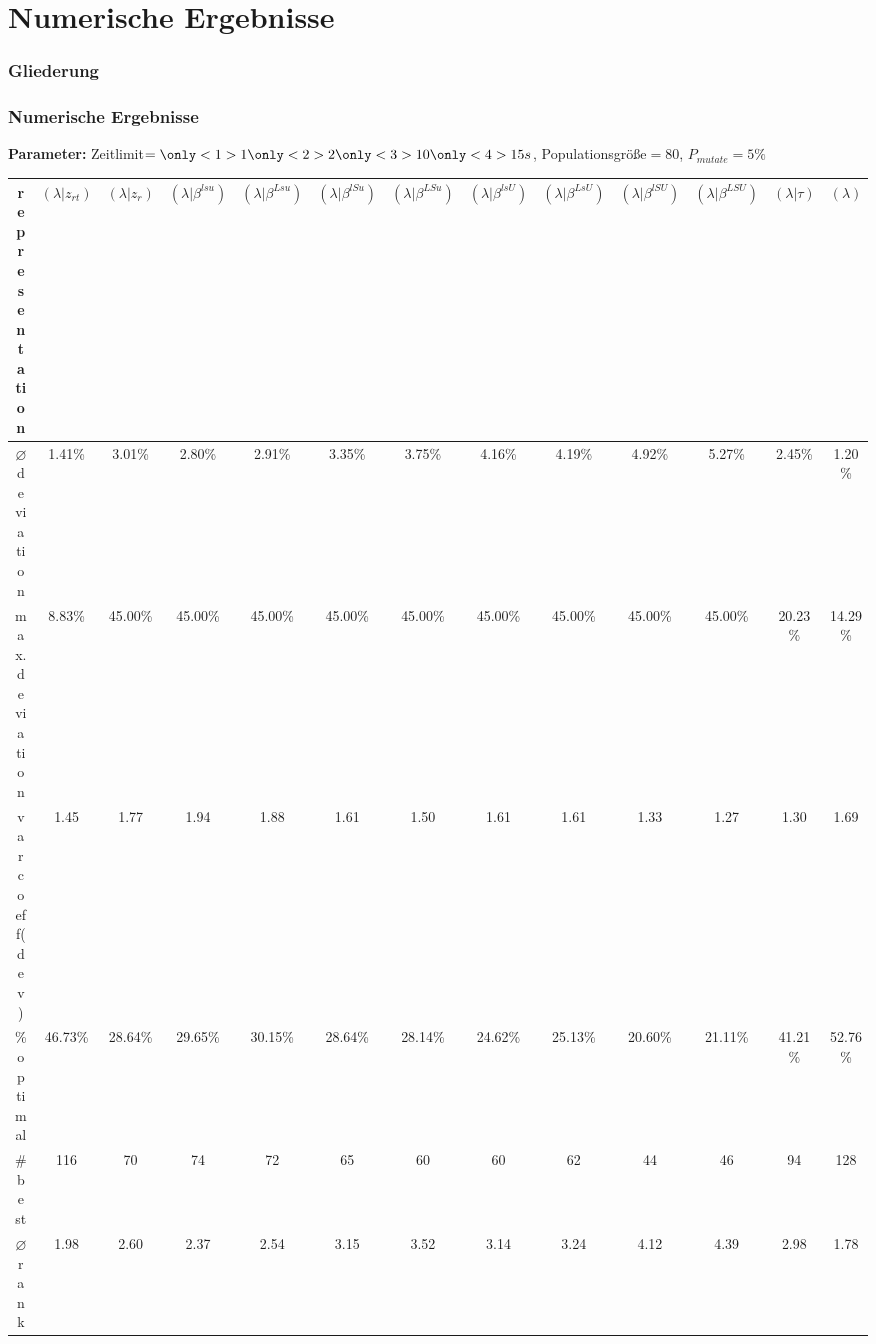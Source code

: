 \section{Numerische Ergebnisse}
\begin{frame}
\frametitle{Gliederung}
\tableofcontents[current] %
\end{frame}


\begin{frame}[t]
\frametitle{Numerische Ergebnisse}
\begin{footnotesize}
\textbf{Parameter:} Zeitlimit$=\only<1>{1}\only<2>{2}\only<3>{10}\only<4>{15}s$, Populationsgröße$=80$, $P_{mutate}=5\%$\\

\begin{center}

\begin{tabular}{ccccccccccccc}
\hline
representation & $(\lambda|z_{rt})$ & $(\lambda|z_r)$ & $(\lambda|\beta^{lsu})$ & $(\lambda|\beta^{Lsu})$ & $(\lambda|\beta^{lSu})$ & $(\lambda|\beta^{LSu})$ & $(\lambda|\beta^{lsU})$ & $(\lambda|\beta^{LsU})$ & $(\lambda|\beta^{lSU})$ & $(\lambda|\beta^{LSU})$ & $(\lambda|\tau)$ & $(\lambda)$\\[3pt]
\hline
$\varnothing$ deviation&1.41\%&3.01\%&2.80\%&2.91\%&3.35\%&3.75\%&4.16\%&4.19\%&4.92\%&5.27\%&2.45\%&1.20\%\\
\hline
max. deviation&8.83\%&45.00\%&45.00\%&45.00\%&45.00\%&45.00\%&45.00\%&45.00\%&45.00\%&45.00\%&20.23\%&14.29\%\\
\hline
varcoeff(dev)&1.45&1.77&1.94&1.88&1.61&1.50&1.61&1.61&1.33&1.27&1.30&1.69\\
\hline
\% optimal&46.73\%&28.64\%&29.65\%&30.15\%&28.64\%&28.14\%&24.62\%&25.13\%&20.60\%&21.11\%&41.21\%&52.76\%\\
\hline
\# best&116&70&74&72&65&60&60&62&44&46&94&128\\
\hline
$\varnothing$ rank&1.98&2.60&2.37&2.54&3.15&3.52&3.14&3.24&4.12&4.39&2.98&1.78\\\hline
\end{tabular}

\end{center}
\end{footnotesize}
\end{frame}

